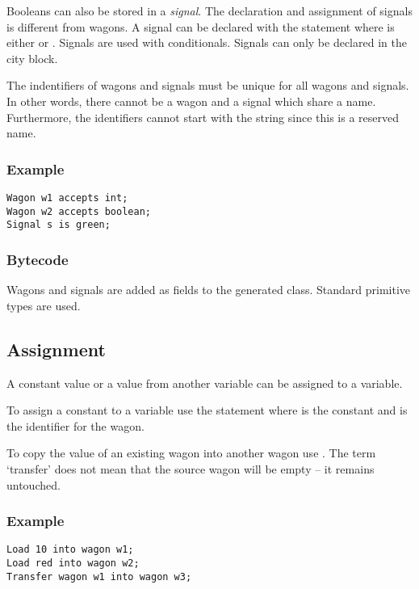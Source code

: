 Booleans can also be stored in a \emph{signal}. The declaration and assignment of signals is different from wagons. A signal can be declared with the statement  where  is either  or . Signals are used with conditionals. Signals can only be declared in the  city block.

The indentifiers of wagons and signals must be unique for all wagons and signals. In other words, there cannot be a wagon and a signal which share a name. Furthermore, the identifiers cannot start with the string  since this is a reserved name.

\subsubsection*{Example}

\begin{lstlisting}
Wagon w1 accepts int;
Wagon w2 accepts boolean;
Signal s is green;
\end{lstlisting}

\subsubsection*{Bytecode}

Wagons and signals are added as fields to the generated class. Standard primitive types are used.

\subsection{Assignment}

A constant value or a value from another variable can be assigned to a variable.

To assign a constant to a variable use the statement  where  is the constant and  is the identifier for the wagon.

To copy the value of an existing wagon into another wagon use . The term `transfer' does not mean that the source wagon will be empty -- it remains untouched.

\subsubsection*{Example}

\begin{lstlisting}
Load 10 into wagon w1;
Load red into wagon w2;
Transfer wagon w1 into wagon w3;
\end{lstlisting}

